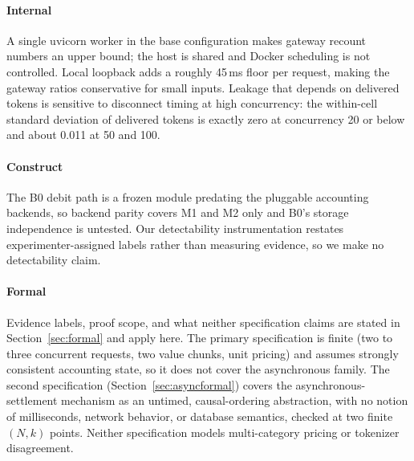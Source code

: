 \documentclass[final,5p,times,twocolumn,number]{elsarticle}
\begin{document}
\paragraph{Internal}
A single uvicorn worker in the base configuration makes gateway recount numbers an upper
bound; the host is shared and Docker scheduling is not controlled. Local loopback adds a
roughly 45\,ms floor per request, making the gateway ratios conservative for small
inputs. Leakage that depends on delivered tokens is sensitive to
disconnect timing at high concurrency: the within-cell standard deviation of delivered
tokens is exactly zero at concurrency 20 or below and about 0.011 at 50 and 100.

\paragraph{Construct}
The B0 debit path is a frozen module predating the pluggable accounting backends, so
backend parity covers M1 and M2 only and B0's storage independence is untested. Our detectability instrumentation restates
experimenter-assigned labels rather than measuring evidence, so we make no detectability
claim.

\paragraph{Formal}
Evidence labels, proof scope, and what neither specification claims are stated in
Section~\ref{sec:formal} and apply here. The primary specification is
finite (two to three concurrent requests, two value chunks, unit pricing) and assumes
strongly consistent accounting state, so it does not cover the asynchronous family. The
second specification (Section~\ref{sec:asyncformal}) covers the asynchronous-settlement
mechanism as an untimed, causal-ordering abstraction, with no notion of milliseconds,
network behavior, or database semantics, checked at two finite $(N,k)$ points. Neither
specification models multi-category pricing or tokenizer disagreement.
\end{document}
